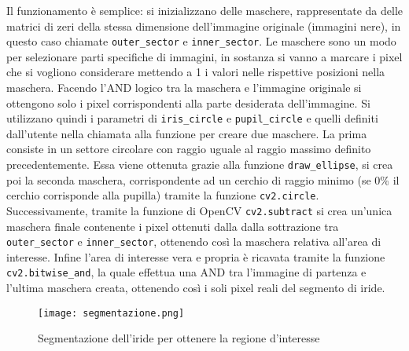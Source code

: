 Il funzionamento è semplice: si inizializzano delle maschere, rappresentate da delle matrici di zeri della stessa dimensione dell’immagine originale (immagini nere), in questo caso chiamate \texttt{outer\_sector} e \texttt{inner\_sector}. Le maschere sono un modo per selezionare parti specifiche di immagini, in sostanza si vanno a marcare i pixel che si vogliono considerare mettendo a 1 i valori nelle rispettive posizioni nella maschera. Facendo l’AND logico tra la maschera e l’immagine originale si ottengono solo i pixel corrispondenti alla parte desiderata dell’immagine. Si utilizzano quindi i parametri di \texttt{iris\_circle} e \texttt{pupil\_circle} e quelli definiti dall’utente nella chiamata alla funzione per creare due maschere. La prima consiste in un settore circolare con raggio uguale al raggio massimo definito precedentemente. Essa viene ottenuta grazie alla funzione \texttt{draw\_ellipse}, si crea poi la seconda maschera, corrispondente ad un cerchio di raggio minimo (se 0\% il cerchio corrisponde alla pupilla) tramite la funzione \texttt{cv2.circle}. Successivamente, tramite la funzione di OpenCV \texttt{cv2.subtract} si crea un’unica maschera finale contenente i pixel ottenuti dalla dalla sottrazione tra \texttt{outer\_sector} e \texttt{inner\_sector}, ottenendo così la maschera relativa all’area di interesse. Infine l’area di interesse vera e propria è ricavata tramite la funzione \texttt{cv2.bitwise\_and}, la quale effettua una AND tra l’immagine di partenza e l’ultima  maschera creata, ottenendo così i soli pixel reali del segmento di iride.

\begin{figure}[h]
  \centering
  \texttt{[image: segmentazione.png]}
  \caption{Segmentazione dell'iride per ottenere la regione d'interesse}
\end{figure}
